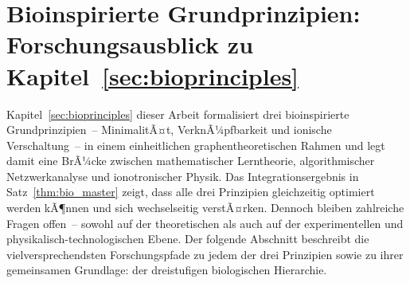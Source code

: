 ﻿\documentclass[12pt, a4paper, openany]{report}
\begin{document}
\section{Bioinspirierte Grundprinzipien: Forschungsausblick zu
  Kapitel~\ref{sec:bioprinciples}}
\label{sec:outlook_bioprinciples}

Kapitel~\ref{sec:bioprinciples} dieser Arbeit formalisiert drei
bioinspirierte Grundprinzipien~-- MinimalitÃ¤t, VerknÃ¼pfbarkeit und ionische
Verschaltung~-- in einem einheitlichen graphentheoretischen Rahmen und legt
damit eine BrÃ¼cke zwischen mathematischer Lerntheorie, algorithmischer
Netzwerkanalyse und ionotronischer Physik.  Das Integrationsergebnis in
Satz~\ref{thm:bio_master} zeigt, dass alle drei Prinzipien gleichzeitig
optimiert werden kÃ¶nnen und sich wechselseitig verstÃ¤rken.  Dennoch bleiben
zahlreiche Fragen offen~-- sowohl auf der theoretischen als auch auf der
experimentellen und physikalisch-technologischen Ebene.  Der folgende
Abschnitt beschreibt die vielversprechendsten Forschungspfade zu jedem der
drei Prinzipien sowie zu ihrer gemeinsamen Grundlage: der drei\-stu\-fi\-gen
biologischen Hierarchie.
\end{document}
